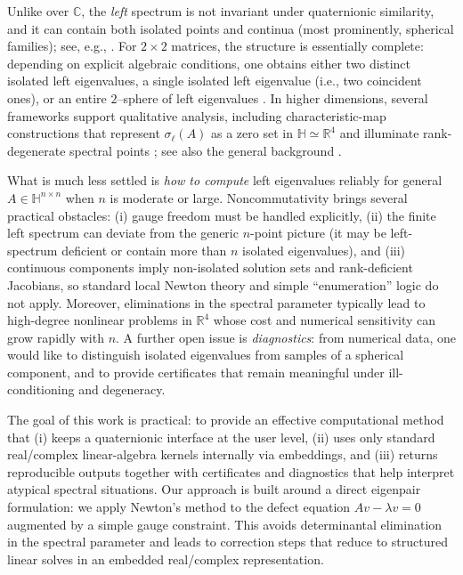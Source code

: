 \documentclass[preprint,12pt]{elsarticle}  %
\theoremstyle{definition}
\theoremstyle{definition}
\theoremstyle{definition}
\theoremstyle{definition}
\theoremstyle{definition}
\theoremstyle{remark}
\theoremstyle{remark}
\theoremstyle{remark}
\newcommand{\RR}{\mathbb{R}}
\newcommand{\CC}{\mathbb{C}}
\newcommand{\HH}{\mathbb{H}}
\begin{document}
Unlike over $\CC$, the \emph{left} spectrum is not invariant under quaternionic similarity, and it can contain both isolated
points and continua (most prominently, spherical families); see, e.g., \cite{HuangSo2001,FarenickPidkowich2003}.
For \(2\times2\) matrices, the structure is essentially complete: depending on explicit algebraic conditions, one obtains either two distinct isolated left eigenvalues, a single isolated left eigenvalue (i.e., two coincident ones), or an entire \(2\)--sphere of left eigenvalues \cite{HuangSo2001}.
 In higher dimensions, several frameworks support
qualitative analysis, including characteristic-map constructions that represent $\sigma_\ell(A)$ as a zero set in $\HH\simeq\RR^4$ and illuminate rank-degenerate spectral points
\cite{MaciasVirgosPereiraSaez2014,MaciasVirgosPereiraSaez2014b}; see also the general background
\cite{Zhang1997,Zhang2007,Rodman2014}.

What is much less settled is \emph{how to compute} left eigenvalues reliably for general $A\in\HH^{n\times n}$ when $n$ is moderate or large. Noncommutativity brings several practical obstacles: (i) gauge freedom must be handled explicitly,
(ii) the finite left spectrum can deviate from the generic \(n\)-point picture (it may be left-spectrum deficient or contain more than \(n\) isolated eigenvalues), and
(iii) continuous components imply non-isolated solution sets and rank-deficient Jacobians, so standard local Newton theory and simple ``enumeration'' logic do not apply.
Moreover, eliminations in the spectral parameter typically lead to high-degree nonlinear problems in $\RR^4$ whose
cost and numerical sensitivity can grow rapidly with $n$. A further open issue is \emph{diagnostics}: from numerical data, one would like to distinguish isolated eigenvalues from samples of a spherical component, and to provide certificates that remain
meaningful under ill-conditioning and degeneracy.

The goal of this work is practical: to provide an effective computational method that (i) keeps a quaternionic interface at
the user level, (ii) uses only standard real/complex linear-algebra kernels internally via embeddings, and (iii) returns
reproducible outputs together with certificates and diagnostics that help interpret atypical spectral situations. Our approach
is built around a direct eigenpair formulation: we apply Newton's method to the defect equation $Av-\lambda v=0$ augmented
by a simple gauge constraint. This avoids determinantal elimination in the spectral parameter and leads to correction steps that reduce to structured linear solves in an embedded real/complex representation.
\end{document}
